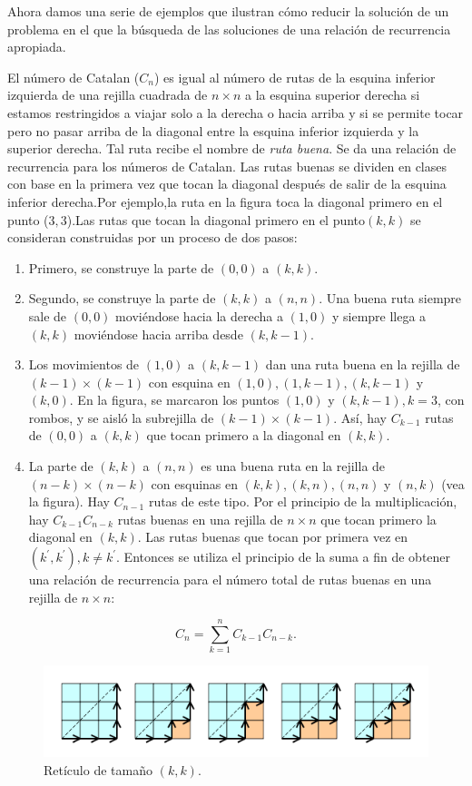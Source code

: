 Ahora damos una serie de ejemplos que ilustran cómo reducir la solución de un problema en el que la búsqueda de las soluciones de una relación de recurrencia apropiada.

\begin{example}
	El número de Catalan ($C_{n} $) es igual al número de rutas de la esquina inferior izquierda de una rejilla cuadrada de $n\times n$ a la esquina superior derecha si estamos restringidos a viajar solo a la derecha o hacia arriba y si se permite tocar pero no pasar arriba de la diagonal entre la esquina inferior izquierda y la superior derecha. Tal ruta recibe el nombre de \emph{ruta buena}. Se da una relación de recurrencia para los números de Catalan. Las rutas buenas se dividen en clases con base en  la primera vez que tocan la diagonal después de salir de la esquina inferior derecha.Por ejemplo,la ruta en la figura toca la diagonal primero en el punto ($3,3$).Las rutas que tocan la diagonal primero en el punto$(k,k)$ se consideran construidas por un proceso de dos pasos:
	\begin{enumerate}
		\item Primero, se construye la parte de $(0,0)$ a $(k,k)$.
		\item Segundo, se construye la parte de $(k,k)$ a $(n,n)$. Una buena ruta siempre sale de $(0,0)$ moviéndose hacia la derecha a $(1,0)$ y siempre llega a $(k,k)$ moviéndose hacia arriba desde $(k,k-1)$.
		\item Los movimientos de $(1,0)$ a $(k,k-1)$ dan una ruta buena en la rejilla de $(k-1)\times(k-1) $ con esquina en $ (1,0),(1,k-1),(k,k-1)$ y $ (k,0)$. En la figura, se marcaron los puntos $(1,0)$ y $(k,k-1),k=3$, con rombos, y se aisló la subrejilla de $(k-1)\times(k-1)$. Así, hay $C_{k-1}$ rutas de $(0,0)$ a $(k,k)$ que tocan primero a la diagonal en $(k,k)$.
		\item La parte de $(k,k)$ a $(n,n)$ es una buena ruta en la rejilla de $(n-k)\times(n-k)$ con esquinas en $(k,k),(k,n),(n,n)$ y $(n,k)$ (vea la figura). Hay $C_{n-1}$ rutas de este tipo. Por el principio de la multiplicación, hay $C_{k-1}C_{n-k}$ rutas buenas en una rejilla de $n\times n$ que tocan primero la diagonal en $(k,k)$. Las rutas buenas que tocan por primera vez en $(k^{\prime}, k^{\prime}),k\neq k^{\prime}$. Entonces se utiliza el principio de la suma a fin de obtener una relación de recurrencia para el número total de rutas buenas en una rejilla de $n\times n$:
	\end{enumerate}
	\[ C_{n}=\sum_{k=1}^{n}C_{k-1}C_{n-k}. \]
	\begin{figure}[ht!]
		\sidecaption[t]%
		\centering
		\includegraphics[width=0.4\paperwidth]{./img/catalan}
		\caption{\label{fig:catalan} Retículo de tamaño $\left(k,k\right)$.}
	\end{figure}
\end{example}

